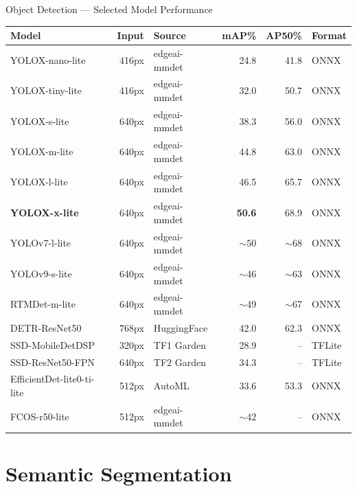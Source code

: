 \documentclass[aspectratio=169,12pt]{beamer}
\begin{document}
\begin{frame}{Object Detection --- Selected Model Performance}
  \centering
  \scriptsize
  \begin{tabular}{lrlrrl}
    \toprule
    \textbf{Model} & \textbf{Input} & \textbf{Source} & \textbf{mAP\%} & \textbf{AP50\%} & \textbf{Format} \\
    \midrule
    \rowcolor{TIGray} YOLOX-nano-lite & 416px & edgeai-mmdet & 24.8 & 41.8 & ONNX \\
    YOLOX-tiny-lite & 416px & edgeai-mmdet & 32.0 & 50.7 & ONNX \\
    \rowcolor{TIGray} YOLOX-s-lite & 640px & edgeai-mmdet & 38.3 & 56.0 & ONNX \\
    YOLOX-m-lite & 640px & edgeai-mmdet & 44.8 & 63.0 & ONNX \\
    \rowcolor{TIGray} YOLOX-l-lite & 640px & edgeai-mmdet & 46.5 & 65.7 & ONNX \\
    \textbf{YOLOX-x-lite} & 640px & edgeai-mmdet & \textbf{50.6} & 68.9 & ONNX \\
    \rowcolor{TIGray} YOLOv7-l-lite & 640px & edgeai-mmdet & $\sim$50 & $\sim$68 & ONNX \\
    YOLOv9-s-lite & 640px & edgeai-mmdet & $\sim$46 & $\sim$63 & ONNX \\
    \rowcolor{TIGray} RTMDet-m-lite & 640px & edgeai-mmdet & $\sim$49 & $\sim$67 & ONNX \\
    DETR-ResNet50 & 768px & HuggingFace & 42.0 & 62.3 & ONNX \\
    \rowcolor{TIGray} SSD-MobileDetDSP & 320px & TF1 Garden & 28.9 & -- & TFLite \\
    SSD-ResNet50-FPN & 640px & TF2 Garden & 34.3 & -- & TFLite \\
    \rowcolor{TIGray} EfficientDet-lite0-ti-lite & 512px & AutoML & 33.6 & 53.3 & ONNX \\
    FCOS-r50-lite & 512px & edgeai-mmdet & $\sim$42 & -- & ONNX \\
    \bottomrule
  \end{tabular}
\end{frame}

\section{Semantic Segmentation}
\end{document}
